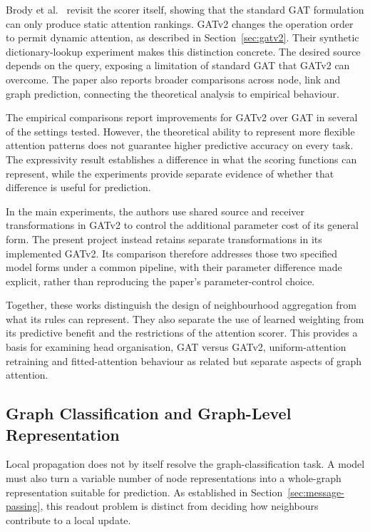 \documentclass[11pt,a4paper]{article}
\begin{document}
Brody et al.~\cite{brody2022attentive} revisit the scorer itself, showing that the standard GAT formulation can only produce static attention rankings. GATv2 changes the operation order to permit dynamic attention, as described in Section~\ref{sec:gatv2}. Their synthetic dictionary-lookup experiment makes this distinction concrete. The desired source depends on the query, exposing a limitation of standard GAT that GATv2 can overcome. The paper also reports broader comparisons across node, link and graph prediction, connecting the theoretical analysis to empirical behaviour.

The empirical comparisons report improvements for GATv2 over GAT in several of the settings tested. However, the theoretical ability to represent more flexible attention patterns does not guarantee higher predictive accuracy on every task. The expressivity result establishes a difference in what the scoring functions can represent, while the experiments provide separate evidence of whether that difference is useful for prediction.

In the main experiments, the authors use shared source and receiver transformations in GATv2 to control the additional parameter cost of its general form. The present project instead retains separate transformations in its implemented GATv2. Its comparison therefore addresses those two specified model forms under a common pipeline, with their parameter difference made explicit, rather than reproducing the paper's parameter-control choice.

Together, these works distinguish the design of neighbourhood aggregation from what its rules can represent. They also separate the use of learned weighting from its predictive benefit and the restrictions of the attention scorer. This provides a basis for examining head organisation, GAT versus GATv2, uniform-attention retraining and fitted-attention behaviour as related but separate aspects of graph attention.

\subsection{Graph Classification and Graph-Level Representation}
\label{sec:literature-readout}

Local propagation does not by itself resolve the graph-classification task. A model must also turn a variable number of node representations into a whole-graph representation suitable for prediction. As established in Section~\ref{sec:message-passing}, this readout problem is distinct from deciding how neighbours contribute to a local update.
\end{document}
